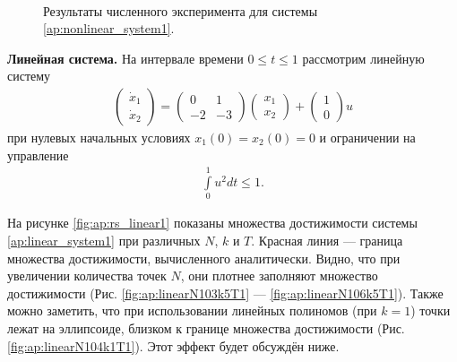 \documentclass[../main.tex]{subfiles}
\begin{document}
\begin{figure}[ht!]
\begin{minipage}[b]{.3\linewidth}
 	\end{minipage} 
 	\caption{Результаты численного эксперимента для системы \eqref{ap:nonlinear_system1}.}\label{fig:ap:rs_nonlinear1}
 \end{figure}
 
 \textbf{Линейная система.} На интервале времени $ 0 \leqslant t \leqslant 1$ рассмотрим линейную систему 
 \begin{gather}\label{ap:linear_system1}
 	\begin{pmatrix} 
 		\dot{x}_1 \\
 		\dot{x}_2 
 	\end{pmatrix} = 
 	\begin{pmatrix}
 		0 & 1 \\
 		-2 & -3
 	\end{pmatrix}
 	\begin{pmatrix} 
 		x_1 \\
 		x_2 
 	\end{pmatrix} +
 	\begin{pmatrix} 1 \\ 0
 	\end{pmatrix} u
 \end{gather}
 при нулевых начальных условиях $x_1(0) = x_2(0) = 0 $ и ограничении на управление 
 \begin{gather*}
 	\int\limits_0^1 u^2dt \leqslant 1.
 \end{gather*}
 
 На рисунке \ref{fig:ap:rs_linear1} показаны множества достижимости системы \eqref{ap:linear_system1} при различных $N$, $k$ и $T$.
 Красная линия --- граница множества достижимости, вычисленного аналитически.
 Видно, что при увеличении количества точек $N$, они плотнее заполняют множество достижимости (Рис. \ref{fig:ap:linearN103k5T1} --- \ref{fig:ap:linearN106k5T1}). 
 Также можно заметить, что при использовании линейных полиномов (при $k = 1$) точки лежат на эллипсоиде, близком к границе множества достижимости (Рис. \ref{fig:ap:linearN104k1T1}). 
 Этот эффект будет обсуждён ниже.
 
\end{document}

